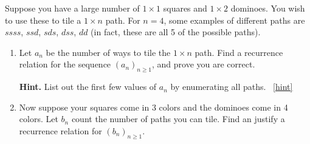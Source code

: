 \documentclass{book}
\begin{document}
\setcounter{project}{139}
\addtocounter{project}{-1}
\begin{activity}[]\label{act-dominoes}
\hypertarget{p-923}{}%
Suppose you have a large number of \(1\times 1\) squares and \(1 \times 2\) dominoes.  You wish to use these to tile a \(1 \times n\) path.  For \(n = 4\), some examples of different paths are \(ssss\), \(ssd\), \(sds\), \(dss\), \(dd\) (in fact, these are all 5 of the possible paths).%
\begin{enumerate}[font=\bfseries,label=(\alph*),ref=\alph*]
\item\label{task-173} \hypertarget{p-924}{}%
Let \(a_n\) be the number of ways to tile the \(1 \times n\) path.  Find a recurrence relation for the sequence \((a_n)_{n \ge 1}\), and prove you are correct.%
\par\smallskip%
\noindent\textbf{Hint.}\hypertarget{hint-98}{}\quad%
\hypertarget{p-925}{}%
List out the first few values of \(a_n\) by enumerating all paths.%
~\hfill{\tiny\hyperlink{a-139.a}{[hint]}\hypertarget{q-139.a}{}}\item\label{task-174} \hypertarget{p-926}{}%
Now suppose your squares come in 3 colors and the dominoes come in 4 colors.  Let \(b_n\) count the number of paths you can tile.  Find an justify a recurrence relation for \((b_n)_{n \ge 1}\).%
\end{enumerate}
\end{activity}

\clearpage
\end{document}

